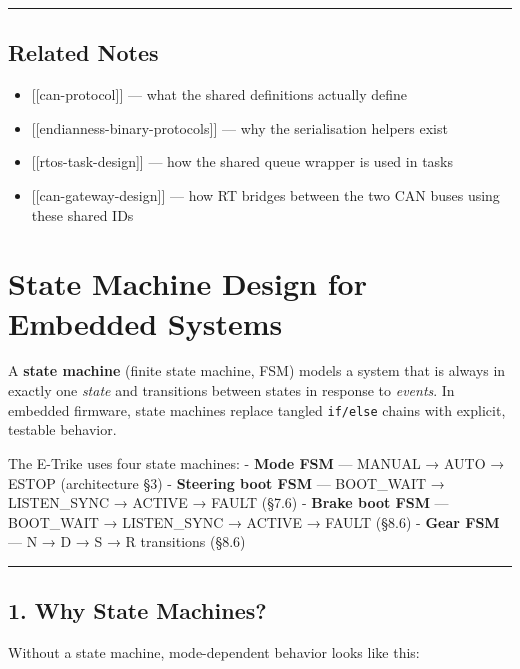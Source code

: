 \documentclass[12pt,a4paper,oneside]{report}
\providecommand{\tightlist}{\setlength{\itemsep}{0pt}\setlength{\parskip}{0pt}}
\begin{document}
\begin{center}\rule{0.5\linewidth}{0.5pt}\end{center}

\section{Related Notes}\label{related-notes}

\begin{itemize}
\tightlist
\item
  {[}{[}can-protocol{]}{]} --- what the shared definitions actually define
\item
  {[}{[}endianness-binary-protocols{]}{]} --- why the serialisation helpers
  exist
\item
  {[}{[}rtos-task-design{]}{]} --- how the shared queue wrapper is used in tasks
\item
  {[}{[}can-gateway-design{]}{]} --- how RT bridges between the two CAN buses
  using these shared IDs
\end{itemize}


\chapter{State Machine Design for Embedded
Systems}\label{state-machine-design-for-embedded-systems}

A \textbf{state machine} (finite state machine, FSM) models a system that is
always in exactly one \emph{state} and transitions between states in response to
\emph{events}. In embedded firmware, state machines replace tangled
\texttt{if/else} chains with explicit, testable behavior.

The E-Trike uses four state machines: - \textbf{Mode FSM} --- MANUAL → AUTO →
ESTOP (architecture §3) - \textbf{Steering boot FSM} --- BOOT\_WAIT →
LISTEN\_SYNC → ACTIVE → FAULT (§7.6) - \textbf{Brake boot FSM} --- BOOT\_WAIT →
LISTEN\_SYNC → ACTIVE → FAULT (§8.6) - \textbf{Gear FSM} --- N → D → S → R
transitions (§8.6)

\begin{center}\rule{0.5\linewidth}{0.5pt}\end{center}

\section{1. Why State Machines?}\label{why-state-machines}

Without a state machine, mode-dependent behavior looks like this:
\end{document}
